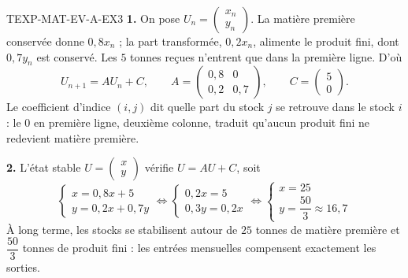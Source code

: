\begin{corrige}{TEXP-MAT-EV-A-EX3}
\textbf{1.} On pose $U_n=\begin{pmatrix}x_n\\y_n\end{pmatrix}$. La matière première conservée donne $0{,}8x_n$ ; la part transformée, $0{,}2x_n$, alimente le produit fini, dont $0{,}7y_n$ est conservé. Les $5$ tonnes reçues n'entrent que dans la première ligne. D'où
\[
  U_{n+1}=AU_n+C,\qquad
  A=\begin{pmatrix}0{,}8&0\\0{,}2&0{,}7\end{pmatrix},\qquad
  C=\begin{pmatrix}5\\0\end{pmatrix}.
\]
Le coefficient d'indice $(i,j)$ dit quelle part du stock $j$ se retrouve dans le stock $i$ : le $0$ en première ligne, deuxième colonne, traduit qu'aucun produit fini ne redevient matière première.

\textbf{2.} L'état stable $U=\begin{pmatrix}x\\y\end{pmatrix}$ vérifie $U=AU+C$, soit
\[
  \begin{cases} x = 0{,}8x + 5 \\ y = 0{,}2x + 0{,}7y \end{cases}
  \iff
  \begin{cases} 0{,}2x = 5 \\ 0{,}3y = 0{,}2x \end{cases}
  \iff
  \begin{cases} x = 25 \\ y = \dfrac{50}{3}\approx16{,}7 \end{cases}
\]
À long terme, les stocks se stabilisent autour de $25$ tonnes de matière première et $\dfrac{50}{3}$ tonnes de produit fini : les entrées mensuelles compensent exactement les sorties.
\end{corrige}
